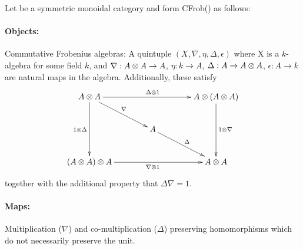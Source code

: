 \begin{example}\label{example:commfrob}
  Let \X be a symmetric monoidal category and form CFrob(\X) as follows: \paragraph{Objects:}
  Commutative Frobenius algebras\cite{kock04}: A quintuple $(X,\nabla,\eta,\Delta,\epsilon)$ where
  X is a $k$-algebra for some field $k$, and $\nabla :A\otimes A \to A$, $\eta:k\to A$, $\Delta : A \to
  A\otimes A$, $\epsilon : A \to k$ are natural maps in the algebra. Additionally, these satisfy
  \[
    \xymatrix @C=40pt @R=25pt{
      A \* A \ar[dd]_{1\*\Delta} \ar[dr]^{\nabla}
        \ar[rr]^{\Delta \* 1} & &
        A \* (A \* A) \ar[dd]^{1 \* \nabla}\\
      & A \ar[dr]^{\Delta} & \\
      (A \* A) \* A \ar[rr]_{\nabla \* 1} & &
        A \* A
    }
  \]
  together with the additional property that $\Delta \nabla = 1$.

  \paragraph{Maps:} Multiplication ($\nabla$) and co-multiplication ($\Delta$) preserving
  homomorphisms which do not necessarily preserve the unit.
\end{example}

